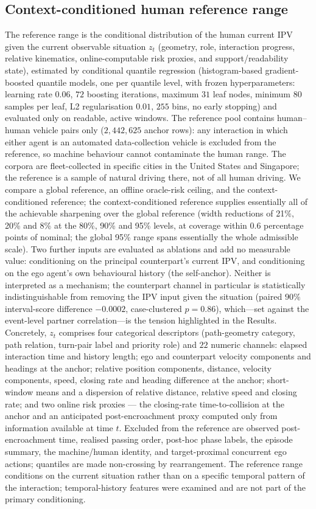 \documentclass[12pt,a4paper]{article}
\begin{document}
\subsection{Context-conditioned human reference range}
The reference range is the conditional distribution of the human current IPV given the current
observable situation $z_t$ (geometry, role, interaction progress, relative kinematics,
online-computable risk proxies, and support/readability state), estimated by conditional quantile regression (histogram-based gradient-boosted quantile models, one per quantile level, with frozen hyperparameters: learning rate $0.06$, $72$ boosting iterations, maximum $31$ leaf nodes, minimum $80$ samples per leaf, L2 regularisation $0.01$, $255$ bins, no early stopping)
and evaluated only on readable, active windows. The reference pool contains human--human vehicle
pairs only ($2{,}442{,}625$ anchor rows): any interaction in which either agent is an automated
data-collection vehicle is excluded from the reference, so machine behaviour cannot contaminate the
human range. The corpora are fleet-collected in specific cities in the United States and Singapore;
the reference is a sample of natural driving there, not of all human driving. We compare a global reference, an offline
oracle-risk ceiling, and the context-conditioned reference; the context-conditioned reference
supplies essentially all of the achievable sharpening over the global reference (width reductions of
21\%, 20\% and 8\% at the 80\%, 90\% and 95\% levels, at coverage within 0.6 percentage points of
nominal; the global 95\% range spans essentially the whole admissible scale). Two further inputs
are evaluated as ablations and add no measurable value: conditioning on the principal counterpart's
current IPV, and conditioning on the ego agent's own behavioural history (the self-anchor). Neither
is interpreted as a mechanism; the counterpart channel in particular is statistically indistinguishable
from removing the IPV input given the situation (paired $90\%$ interval-score difference $-0.0002$,
case-clustered $p=0.86$), which---set against the event-level partner
correlation---is the tension highlighted in the Results. Concretely, $z_t$ comprises four categorical descriptors (path-geometry category, path relation, turn-pair label and priority role) and $22$ numeric channels: elapsed interaction time and history length; ego and counterpart velocity components and headings at the anchor; relative position components, distance, velocity components, speed, closing rate and heading difference at the anchor; short-window means and a dispersion of relative distance, relative speed and closing rate; and two online risk proxies --- the closing-rate time-to-collision at the anchor and an anticipated post-encroachment proxy computed only from information available at time $t$.
Excluded from the reference are observed
post-encroachment time, realised passing order, post-hoc phase labels, the episode summary, the
machine/human identity, and target-proximal concurrent ego actions; quantiles are made non-crossing
by rearrangement. The reference range conditions on the current situation rather than on a specific
temporal pattern of the interaction; temporal-history features were examined and are not part of the
primary conditioning.
\end{document}
